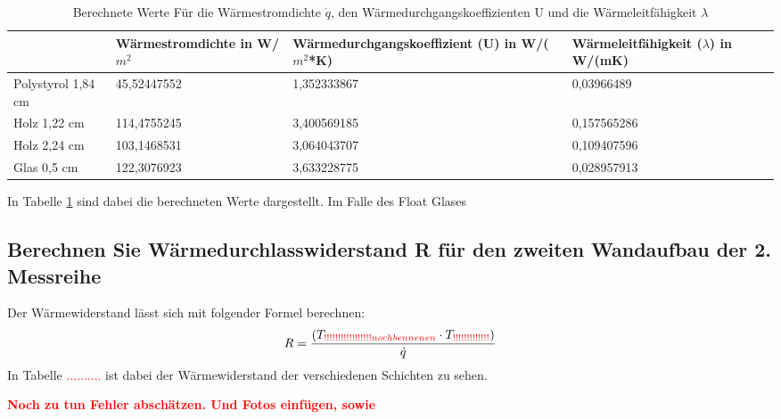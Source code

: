 \begin{table}[!ht]
    \centering
\caption{Berechnete Werte Für die Wärmestromdichte $\dot q$, den Wärmedurchgangskoeffizienten U und die Wärmeleitfähigkeit  $\lambda$ }
\label{tab:230524_Messdaten_Messreihe1(1)}
    \begin{tabular}{|l|l|l|l|}
    \hline
        ~ & Wärmestromdichte in W/$m^2$ & Wärmedurchgangskoeffizient (U) in W/($m^2$*K) & Wärmeleitfähigkeit ($\lambda$) in W/(mK)  \\ \hline
        Polystyrol 1,84 cm & 45,52447552 & 1,352333867 & 0,03966489  \\ \hline
        Holz 1,22 cm & 114,4755245 & 3,400569185 & 0,157565286  \\ \hline
        Holz 2,24 cm & 103,1468531 & 3,064043707 & 0,109407596  \\ \hline
        Glas 0,5 cm & 122,3076923 & 3,633228775 & 0,028957913  \\ \hline
    \end{tabular}
\end{table}
In Tabelle \ref{tab:230524_Messdaten_Messreihe1(1)}  sind dabei die berechneten Werte dargestellt.
Im Falle des Float Glases 
%
%
% 
%
%
\subsection{Berechnen Sie Wärmedurchlasswiderstand R für den zweiten Wandaufbau der 2. Messreihe}
Der Wärmewiderstand lässt sich mit folgender Formel berechnen:
%
\begin{equation}
R=\frac{(T_{\textcolor{red}{!!!!!!!!!!!!!!!!! noch bennenen }} \cdot T_{\textcolor{red}{!!!!!!!!!!!!!}} )}{\dot q}
  \label{eq:230522_Wärmewiderstand}
\end{equation}
%
In Tabelle \textcolor{red}{..........}  ist dabei der Wärmewiderstand der verschiedenen Schichten zu sehen.

\textcolor{red}{\textbf{Noch zu tun Fehler abschätzen. Und Fotos einfügen, sowie  }}